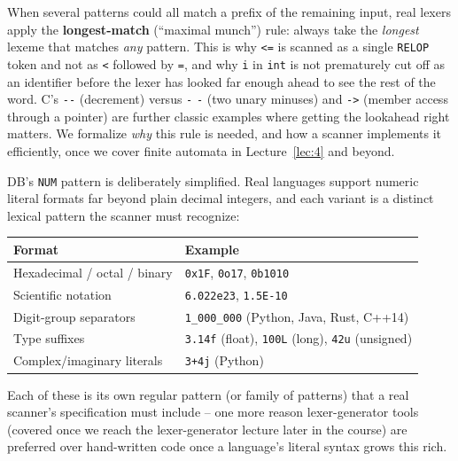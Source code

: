 \documentclass[full-course-notes.tex]{subfiles}
\begin{document}
\begin{enrichment}
When several patterns could all match a prefix of the remaining input, real lexers apply the
\textbf{longest-match} (``maximal munch'') rule: always take the \emph{longest} lexeme that
matches \emph{any} pattern. This is why \texttt{<=} is scanned as a single \texttt{RELOP} token
and not as \texttt{<} followed by \texttt{=}, and why \texttt{i} in \texttt{int} is not
prematurely cut off as an identifier before the lexer has looked far enough ahead to see the
rest of the word. C's \texttt{-{}-{}} (decrement) versus \texttt{-} \texttt{-} (two unary
minuses) and \texttt{-{}>} (member access through a pointer) are further classic examples where
getting the lookahead right matters. We formalize \emph{why} this rule is needed, and how a
scanner implements it efficiently, once we cover finite automata in Lecture~\ref{lec:4} and
beyond.
\end{enrichment}

\begin{enrichment}
DB's \texttt{NUM} pattern is deliberately simplified. Real languages support numeric literal
formats far beyond plain decimal integers, and each variant is a distinct lexical pattern the
scanner must recognize:
\begin{center}
\small
\begin{tabularx}{\textwidth}{@{}l X@{}}
\toprule
\textbf{Format} & \textbf{Example} \\
\midrule
Hexadecimal / octal / binary & \texttt{0x1F}, \texttt{0o17}, \texttt{0b1010} \\
Scientific notation & \texttt{6.022e23}, \texttt{1.5E-10} \\
Digit-group separators & \texttt{1\_000\_000} (Python, Java, Rust, C++14) \\
Type suffixes & \texttt{3.14f} (float), \texttt{100L} (long), \texttt{42u} (unsigned) \\
Complex/imaginary literals & \texttt{3+4j} (Python) \\
\bottomrule
\end{tabularx}
\end{center}
Each of these is its own regular pattern (or family of patterns) that a real scanner's
specification must include -- one more reason lexer-generator tools (covered once we reach the
lexer-generator lecture later in the course) are preferred over hand-written code once a
language's literal syntax grows this rich.
\end{enrichment}
\end{document}
